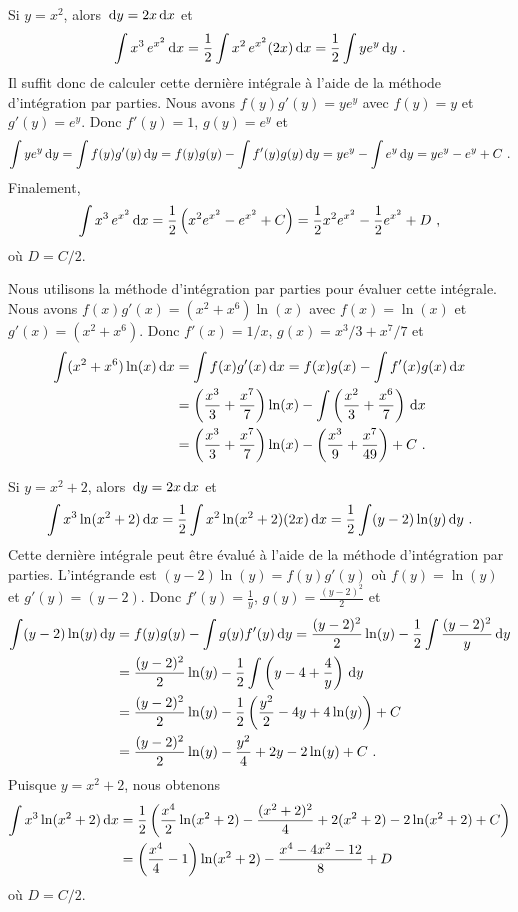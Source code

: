 {
Si $y=x^2$, alors $\,\mathrm{d}y = 2x \,\mathrm{d}x$ et
\[
\int x^3 \, e^{x^2} \,\mathrm{d}x = \frac{1}{2} \int x^2 \, e^{x^2} (2x) \,\mathrm{d}x
= \frac{1}{2} \int y e^y \,\mathrm{d}y \ .
\]
Il suffit donc de calculer cette dernière intégrale à l'aide de la méthode
d'intégration par parties.  Nous avons $f(y) g'(y) = y e^y$ avec $f(y) = y$ et
$g'(y) = e^y$.  Donc $f'(y) = 1$, $g(y) = e^y$ et
\[
\int y e^y \,\mathrm{d}y = \int f(y) g'(y) \,\mathrm{d}y
= f(y) g(y) - \int f'(y) g(y) \,\mathrm{d}y
= ye^y - \int e^y \,\mathrm{d}y = y e^y - e^y + C \ .
\]
Finalement,
\[
\int x^3 \, e^{x^2} \,\mathrm{d}x
= \frac{1}{2} \left( x^2 e^{x^2} - e^{x^2} + C \right)
= \frac{1}{2} x^2 e^{x^2} - \frac{1}{2} e^{x^2} + D \ ,
\]
où $D=C/2$.

Nous utilisons la méthode d'intégration par parties pour évaluer cette
intégrale.\\
Nous avons $f(x) g'(x) = (x^2+x^6) \ln(x)$ avec $f(x) = \ln(x)$ et
$g'(x) = (x^2+x^6)$.  Donc $f'(x) = 1/x$, $g(x) = x^3/3 + x^7/7$ et 
\begin{align*}
\int (x^2+x^6) \ln(x) \,\mathrm{d}x &= \int f(x) g'(x) \,\mathrm{d}x
= f(x) g(x) - \int f'(x) g(x) \,\mathrm{d}x \\
&= \left(\frac{x^3}{3} + \frac{x^7}{7}\right)\ln(x)
- \int \left(\frac{x^2}{3} + \frac{x^6}{7}\right) \,\mathrm{d}x \\
&= \left(\frac{x^3}{3} + \frac{x^7}{7}\right)\ln(x)
- \left(\frac{x^3}{9} + \frac{x^7}{49}\right) + C \ .
\end{align*}

 Si $y=x^2+2$, alors $\,\mathrm{d}y = 2 x \,\mathrm{d}x$ et
\[
\int x^3\ln(x^2+2) \,\mathrm{d}x = \frac{1}{2}\int x^2 \ln(x^2+2)(2x) \,\mathrm{d}x =
\frac{1}{2} \int (y-2) \ln(y) \,\mathrm{d}y \ .
\]
Cette dernière intégrale peut être évalué à l'aide de la méthode
d'intégration par parties.  L'intégrande est
$\displaystyle (y-2)\ln(y) = f(y)g'(y)$ où $f(y)=\ln(y)$ et
$g'(y)=(y-2)$.  Donc $\displaystyle f'(y)= \frac{1}{y}$,
$\displaystyle g(y) = \frac{(y-2)^2}{2}$ et
\begin{align*}
\int (y-2) \ln(y) \,\mathrm{d}y &= f(y)g(y)- \int g(y)f'(y) \,\mathrm{d}y
= \frac{(y-2)^2}{2} \ln(y) - \frac{1}{2} \int \frac{(y-2)^2}{y} \,\mathrm{d}y \\
&= \frac{(y-2)^2}{2} \ln(y) - \frac{1}{2}
\int \left( y - 4 + \frac{4}{y} \right) \,\mathrm{d}y \\
&= \frac{(y-2)^2}{2} \ln(y) - \frac{1}{2}
\left( \frac{y^2}{2} - 4y  + 4\ln(y) \right) + C\\
&= \frac{(y-2)^2}{2} \ln(y) - \frac{y^2}{4} + 2y  - 2 \ln(y) + C \ .
\end{align*}
Puisque $y=x^2+2$, nous obtenons
\begin{align*}
\int x^3 \ln(x^2+2) \,\mathrm{d}x &=
\frac{1}{2}\left( \frac{x^4}{2} \ln(x^2+2) - \frac{(x^2+2)^2}{4} + 2(x^2+2)
- 2 \ln(x^2+2) + C \right) \\
&=\left(\frac{x^4}{4} - 1\right)\ln(x^2+2) - \frac{x^4-4x^2-12}{8} + D
\end{align*}
où $D = C/2$.
}

